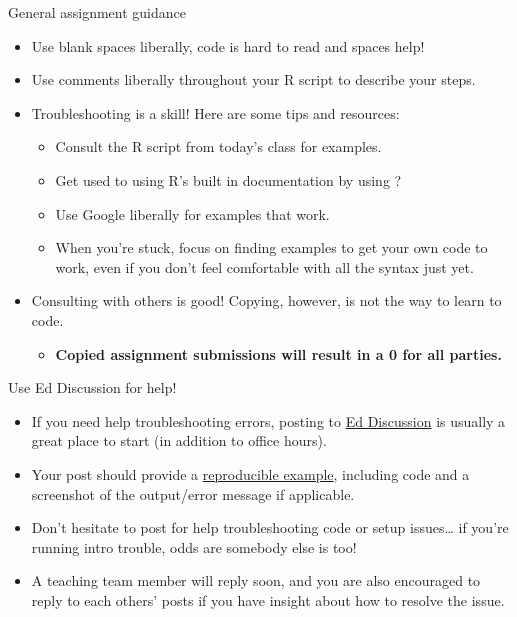 \documentclass[
  8pt,
  ignorenonframetext,
  dvipsnames]{beamer}
\providecommand{\tightlist}{%
  \setlength{\itemsep}{0pt}\setlength{\parskip}{0pt}}
\renewcommand{\textbf}[1]{{\color{darkgray}\bfseries\fontfamily{Montserrat-TOsF}#1}}
\let\olditem\item
\renewcommand{\item}{%
  \olditem\vspace{4pt}
}
\begin{document}
\begin{frame}{General assignment guidance}
\protect\hypertarget{general-assignment-guidance}{}
\begin{itemize}
\tightlist
\item
  Use blank spaces liberally, code is hard to read and spaces help!
\item
  Use comments liberally throughout your R script to describe your
  steps.
\item
  Troubleshooting is a skill! Here are some tips and resources:

  \begin{itemize}
  \tightlist
  \item
    Consult the R script from today's class for examples.
  \item
    Get used to using R's built in documentation by using ?
  \item
    Use Google liberally for examples that work.
  \item
    When you're stuck, focus on finding examples to get your own code to
    work, even if you don't feel comfortable with all the syntax just
    yet.
  \end{itemize}
\item
  Consulting with others is good! Copying, however, is not the way to
  learn to code.

  \begin{itemize}
  \tightlist
  \item
    \textbf{Copied assignment submissions will result in a 0 for all
    parties.}
  \end{itemize}
\end{itemize}
\end{frame}

\begin{frame}{Use Ed Discussion for help!}
\protect\hypertarget{use-ed-discussion-for-help}{}
\begin{itemize}
\tightlist
\item
  If you need help troubleshooting errors, posting to
  \href{https://edstem.org/us/courses/18438/discussion/}{Ed Discussion}
  is usually a great place to start (in addition to office hours).
\item
  Your post should provide a
  \href{https://stackoverflow.com/help/minimal-reproducible-example}{reproducible
  example}, including code and a screenshot of the output/error message
  if applicable.
\item
  Don't hesitate to post for help troubleshooting code or setup
  issues\ldots{} if you're running intro trouble, odds are somebody else
  is too!
\item
  A teaching team member will reply soon, and you are also encouraged to
  reply to each others' posts if you have insight about how to resolve
  the issue.
\end{itemize}
\end{frame}
\end{document}
